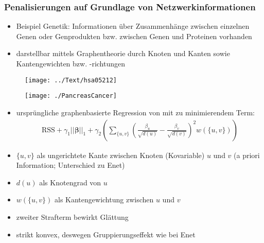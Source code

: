 \documentclass{beamer}
\begin{document}
\begin{frame}
\frametitle{Penalisierungen auf Grundlage von Netzwerkinformationen}
	\begin{itemize}
	\item  Beispiel Genetik: Informationen über Zusammenhänge zwischen einzelnen Genen oder Genprodukten bzw. zwischen Genen und Proteinen vorhanden
	\item darstellbar mittels Graphentheorie durch Knoten und Kanten sowie Kantengewichten bzw. -richtungen
	\end{itemize}
\end{frame}

\begin{frame}
\begin{figure}
\centering
\texttt{[image: ../Text/hsa05212]}
\label{fig:hsa05212}
\end{figure}
\end{frame}


\begin{frame}
\begin{figure}
\centering
\texttt{[image: ./PancreasCancer]}
\label{fig:pancreas}
\end{figure}
\end{frame}

\begin{frame}
	\begin{itemize}
	\item ursprüngliche graphenbasierte Regression von \cite{li_network-constrained_2008} mit zu minimierendem Term:
	\begin{align*}
	\text{RSS}
	+\gamma_1||\boldsymbol{\beta}||_1
	+\gamma_2 \left( \sum_{\{u,v\}} \left(\frac{\beta_u}{\sqrt{d(u)}}-\frac{\beta_v}{\sqrt{d(v)}}\right)^2 w(\{u,v\})\right)
	\end{align*}
	\item $\{u,v\}$ als ungerichtete Kante zwischen Knoten (Kovariable) $u$ und $v$ (a priori Information; Unterschied zu Enet)
	\item $d(u)$ als Knotengrad von $u$
	\item $w(\{u,v\})$ als Kantengewichtung zwischen $u$ und $v$
	\item zweiter Strafterm bewirkt Glättung
	\item strikt konvex, deswegen Gruppierungseffekt wie bei Enet
	\end{itemize}
\end{frame}
\end{document}
